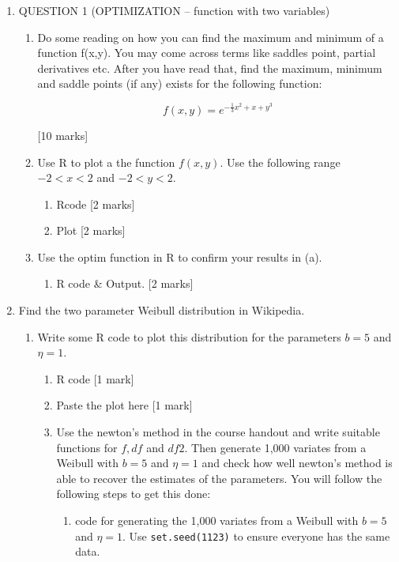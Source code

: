 \documentclass{article}
\begin{document}
    \begin{enumerate}
        \item QUESTION 1  (OPTIMIZATION – function with two variables)
            \begin{enumerate}
                \item Do some reading on how you can find the maximum and minimum of a function f(x,y). You may come across terms like saddles point, partial derivatives etc. After you have read that, find the maximum, minimum and saddle points (if any) exists for the following function:
        
                $$
                    f(x, y) = e^{-\frac{1}{3}x^2 + x + y^3}
                $$
                
                \hfill[10 marks]
                \item Use R to plot a the function $f(x,y)$. Use the following range $ -2 < x < 2$  and $-2 < y < 2$.
                    \begin{enumerate}
                        \item Rcode   
                            \hfill [2 marks]
                        \item Plot
                            \hfill [2 marks]
                    \end{enumerate}
                \item Use the optim function in R to confirm your results in (a).    
                    \begin{enumerate}
                        \item R code \& Output. 
                            \hfill [2 marks]
                    \end{enumerate}
            \end{enumerate}
        \item Find the two parameter Weibull distribution in Wikipedia.
            \begin{enumerate}
                \item Write some R code to plot this distribution for the parameters $b = 5$ and $\eta = 1$.
                \begin{enumerate}
                    \item R code 
                        \hfill[1 mark]  
                    \item Paste the plot here 
                        \hfill[1 mark]
                \item Use the newton’s method in the course handout and write suitable functions for $f, df$ and $df2$. Then generate 1,000 variates from a Weibull with $b = 5$ and $\eta = 1$ and check how well newton’s method is able to recover the estimates of the parameters.   You will follow the following steps to get this done:
                    \begin{enumerate}
                        \item code for generating the 1,000 variates from a Weibull with $b = 5$ and $\eta = 1$.   Use \texttt{set.seed(1123)} to ensure everyone has the same data.      
                        

\end{enumerate}
\end{enumerate}
\end{enumerate}
\end{enumerate}
\end{document}
